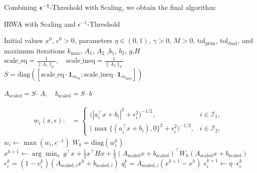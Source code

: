\documentclass{article}
\begin{document}
Combining \(\mathbf{\epsilon^{-1}}\)-Threshold with Scaling, we obtain the final algorithm:
\begin{algorithm}[H]\label{scal-ep}
\caption{IRWA with Scaling and \(\epsilon^{-1}\)-Threshold}
\label{alg:IRWA_Scaling_Epsilon}
\begin{algorithmic}[1]
\Require Initial values $x^0$, $\epsilon^0 > 0$, parameters $\eta \in (0, 1)$, $\gamma > 0$, $M > 0$, $\text{tol}_{\text{prim}}$, $\text{tol}_{\text{dual}}$, and maximum iterations $k_{\text{max}}$, $A_1$, $A_2$ ,$b_1$, $b_2$, $g$,$H$
\State 
$
\text{scale\_eq} = \frac{1}{\|A_1\|_F}, \quad \text{scale\_ineq} = \frac{1}{\|A_2\|_F}
$
\State 
$S = \text{diag}([\text{scale\_eq} \cdot \mathbf{1}_{m_{\text{eq}}}; \text{scale\_ineq} \cdot \mathbf{1}_{m_{\text{ineq}}}])$

\State 
$A_{\text{scaled}} = S \cdot A, \quad b_{\text{scaled}} = S \cdot b$

\Repeat
\State
    \begin{align*}
    w_i(x, \epsilon) :&=
    \begin{cases}
    \big(|a_i^\top x + b_i|^2 + \epsilon_i^2\big)^{-1/2}, & i \in \mathcal{I}_1, \\
    \big(\max\{(a_i^\top x + b_i), 0\}^2 + \epsilon_i^2\big)^{-1/2}, & i \in \mathcal{I}_2,
    \end{cases}
    \end{align*}
    \State $w_i\leftarrow \max(w_i,\epsilon^{-1})$
    \State $W_k = \text{diag}(w_i^k)$
    \State 
    $
    x^{k+1} \gets \arg\min_x \, g^\top x + \frac{1}{2} x^\top H x + \frac{1}{2} (A_{\text{scaled}} x + b_{\text{scaled}})^\top W_k (A_{\text{scaled}} x + b_{\text{scaled}})
    $
    \State 
    $
    r_i^k = (1 - v_i^k)(A_{\text{scaled}, i} x^k + b_{\text{scaled}, i})$ 
    \State $q_i^k = A_{\text{scaled}, i} (x^{k+1} - x^k)
    $
        \State 
        $\epsilon_i^{k+1} \gets \eta \cdot \epsilon_i^k$
    \EndIf
\end{algorithmic}
\end{algorithm}
\end{document}
